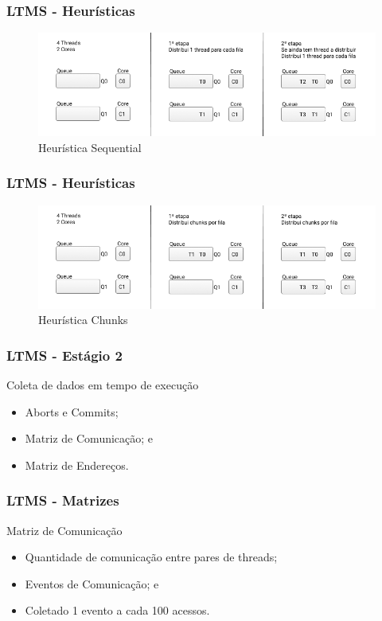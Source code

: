 \documentclass[10pt, pdf,xcolor=pdftex,dvipsnames,table]{beamer}
\begin{document}
\begin{frame} \frametitle{LTMS - Heurísticas}
    \begin{figure}[!h]
        \includegraphics[scale=0.4]{images/Queue_one}
        \caption{Heurística Sequential}
        \label{fig:abusy}
    \end{figure}
\end{frame}

\begin{frame} \frametitle{LTMS - Heurísticas}
    \begin{figure}[!h]
        \includegraphics[scale=0.4]{images/Queue_chunks}
        \caption{Heurística Chunks}
        \label{fig:abusy}
    \end{figure}
\end{frame}

\begin{frame} \frametitle{LTMS - Estágio 2}
    \begin{block}{Coleta de dados em tempo de execução}
        \begin{itemize}
        	\item Aborts e Commits;
        	\item Matriz de Comunicação; e 
        	\item Matriz de Endereços.
        \end{itemize}
    \end{block}
\end{frame}

\begin{frame} \frametitle{LTMS - Matrizes}
    \begin{block}{Matriz de Comunicação}
        \begin{itemize}
        	\item Quantidade de comunicação entre pares de threads;
        	\item Eventos de Comunicação; e
        	\item Coletado 1 evento a cada 100 acessos.
        \end{itemize}
    \end{block}
\end{frame}
\end{document}
